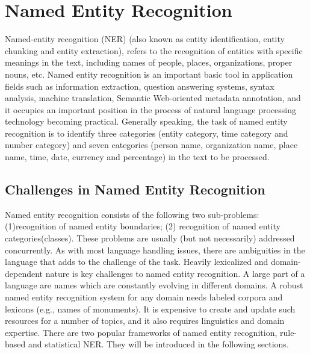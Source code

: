 \section{Named Entity Recognition}
\qquad Named-entity recognition (NER) (also known as entity identification, entity chunking and entity extraction), refers to the recognition of entities with specific meanings in the text, including names of people, places, organizations, proper nouns, etc. Named entity recognition is an important basic tool in application fields such as information extraction, question answering systems, syntax analysis, machine translation, Semantic Web-oriented metadata annotation, and it occupies an important position in the process of natural language processing technology becoming practical. Generally speaking, the task of named entity recognition is to identify three categories (entity category, time category and number category) and seven categories (person name, organization name, place name, time, date, currency and percentage) in the text to be processed.
\cite{NER-wiki}

\subsection{Challenges in Named Entity Recognition}
Named entity recognition consists of the following two sub-problems: (1)recognition of named entity boundaries; (2) recognition of named entity categories(classes). These problems are usually (but not necessarily) addressed concurrently. As with most language handling issues, there are ambiguities in the language that adds to the challenge of the task. Heavily lexicalized and domain-dependent nature is key challenges to named entity recognition. A large part of a language are names which are constantly evolving in different domains. A robust named entity recognition system for any domain needs labeled corpora and lexicons (e.g., names of monuments). It is expensive to create and update such resources for a number of topics, and it also requires linguistics and domain expertise. There are two popular frameworks of named entity recognition, rule-based and statistical NER. They will be introduced in the following sections\cite{zitouni2014natural}.
